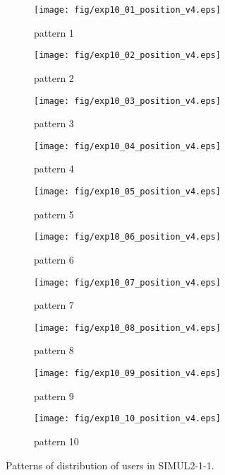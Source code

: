 \begin{figure}
	\begin{center}
		\begin{subfigure}[b]{0.32\textwidth}
			\texttt{[image: fig/exp10\_01\_position\_v4.eps]}
			\caption{pattern 1}
			\label{figure:simul2_1_1_a}
		\end{subfigure}
		\begin{subfigure}[b]{0.32\textwidth}
			\texttt{[image: fig/exp10\_02\_position\_v4.eps]}
			\caption{pattern 2}
			\label{figure:simul2_1_1_b}
		\end{subfigure}
		\begin{subfigure}[b]{0.32\textwidth}
			\texttt{[image: fig/exp10\_03\_position\_v4.eps]}
			\caption{pattern 3}
			\label{figure:simul2_1_1_c}
		\end{subfigure}
		\begin{subfigure}[b]{0.32\textwidth}
			\texttt{[image: fig/exp10\_04\_position\_v4.eps]}
			\caption{pattern 4}
			\label{figure:simul2_1_1_d}
		\end{subfigure}
		\begin{subfigure}[b]{0.32\textwidth}
			\texttt{[image: fig/exp10\_05\_position\_v4.eps]}
			\caption{pattern 5}
			\label{figure:simul2_1_1_e}
		\end{subfigure}
		\begin{subfigure}[b]{0.32\textwidth}
			\texttt{[image: fig/exp10\_06\_position\_v4.eps]}
			\caption{pattern 6}
			\label{figure:simul2_1_1_f}
		\end{subfigure}
		\begin{subfigure}[b]{0.32\textwidth}
			\texttt{[image: fig/exp10\_07\_position\_v4.eps]}
			\caption{pattern 7}
			\label{figure:simul2_1_1_g}
		\end{subfigure}
		\begin{subfigure}[b]{0.32\textwidth}
			\texttt{[image: fig/exp10\_08\_position\_v4.eps]}
			\caption{pattern 8}
			\label{figure:simul2_1_1_h}
		\end{subfigure}
		\begin{subfigure}[b]{0.32\textwidth}
			\texttt{[image: fig/exp10\_09\_position\_v4.eps]}
			\caption{pattern 9}
			\label{figure:simul2_1_1_i}
		\end{subfigure}
		\begin{subfigure}[b]{0.32\textwidth}
			\texttt{[image: fig/exp10\_10\_position\_v4.eps]}
			\caption{pattern 10}
			\label{figure:simul2_1_1_j}
		\end{subfigure}
		\caption{Patterns of distribution of users in SIMUL2-1-1.}
		\label{figure:simul2_1_1_p}
	\end{center}
\end{figure}


